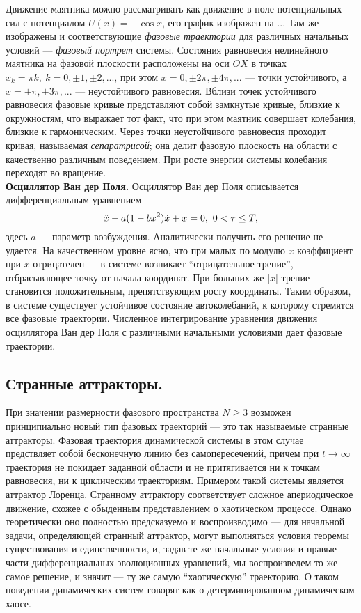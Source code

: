 Движение маятника можно рассматривать как движение в поле потенциальных сил с потенциалом $U(x) = - \cos{x}$, его график изображен на ... Там же изображены и соответствующие \textit{фазовые траектории} для различных начальных условий --- \textit{фазовый портрет} системы. Состояния равновесия нелинейного маятника на фазовой плоскости расположены на оси $OX$ в точках $x_{k} = \pi k, \ k = 0, \pm 1, \pm 2, ...$, при этом $x = 0, \pm 2\pi, \pm 4 \pi, ...$ --- точки устойчивого, а $x = \pm \pi, \pm 3 \pi, ...$ --- неустойчивого равновесия. Вблизи точек устойчивого равновесия фазовые кривые представляют собой замкнутые кривые, близкие к окружностям, что выражает тот факт, что при этом маятник совершает колебания, близкие к гармоническим. Через точки неустойчивого равновесия проходит кривая, называемая \textit{сепаратрисой}; она делит фазовую плоскость на области с качественно различным поведением. При росте энергии системы колебания переходят во вращение.\\
\textbf{Осциллятор Ван дер Поля.} Осциллятор Ван дер Поля описывается дифференциальным уравнением
\begin{equation*}
    \Ddot{x} - a(1-bx^{2})\dot{x} + x = 0, \ 0 < \tau \leq T,
\end{equation*}
здесь $a$ --- параметр возбуждения. Аналитически получить его решение не удается. На качественном уровне ясно, что при малых по модулю $x$ коэффициент при $\dot{x}$ отрицателен --- в системе возникает ``отрицательное трение'', отбрасывающее точку от начала координат. При больших же $|x|$ трение становится положительным, препятствующим росту координаты. Таким образом, в системе существует устойчивое состояние автоколебаний, к которому стремятся все фазовые траектории. Численное интегрирование уравнения движения осциллятора Ван дер Поля с различными начальными условиями дает фазовые траектории.
\subsection{Странные аттракторы.} При значении размерности фазового пространства $N \geq 3$ возможен принципиально новый тип фазовых траекторий --- это так называемые странные аттракторы. Фазовая траектория динамической системы в этом случае предствляет собой бесконечную линию без самопересечений, причем при $t \to \infty$ траектория не покидает заданной области и не притягивается ни к точкам равновесия, ни к циклическим траекториям. Примером такой системы является аттрактор Лоренца. Странному аттрактору соответствует сложное апериодическое движение, схожее с обыденным представлением о хаотическом процессе. Однако теоретически оно полностью предсказуемо и воспроизводимо --- для начальной задачи, определяющей странный аттрактор, могут выполняться условия теоремы существования и единственности, и, задав те же начальные условия и правые части дифференциальных эволюционных уравнений, мы воспроизведем то же самое решение, и значит --- ту же самую ``хаотическую'' траекторию. О таком поведении динамических систем говорят как о детерминированном динамическом хаосе.
